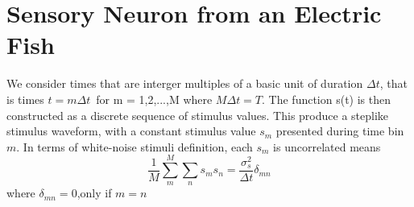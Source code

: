 \documentclass{article}
\begin{document}
\section*{Sensory Neuron from an Electric Fish}
We consider times that are interger multiples of a basic unit of duration $\Delta t$,
that is times $t = m\Delta t$\ for m = 1,2,...,M where $M \Delta t = T$.
The function s(t) is then constructed as a discrete sequence of stimulus values.
This produce a steplike stimulus waveform, with a constant stimulus value $s_m$ presented during time bin $m$.
In terms of white-noise stimuli definition, each $s_m$ is uncorrelated means
\begin{equation}\label{def:white noise}
    \dfrac{1}{M}\sum_m^M \sum_n s_m s_n = \dfrac{\sigma_s^2}{\Delta t} \delta_{mn}
\end{equation}
where $\delta_{mn} = 0$,only if $m=n$
\end{document}
